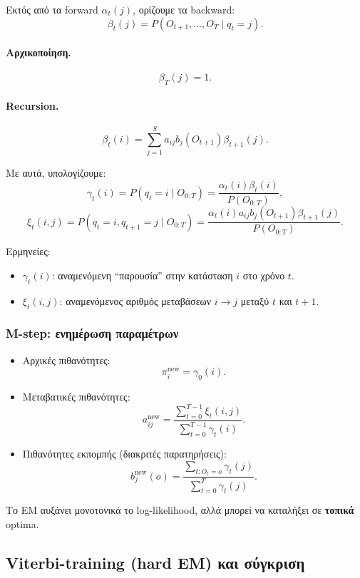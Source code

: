 \documentclass[a4paper,11pt]{article}
\begin{document}
Εκτός από τα forward $\alpha_t(j)$, ορίζουμε τα backward:
\[
\beta_t(j) = P(O_{t+1},\dots,O_T \mid q_t=j).
\]

\paragraph{Αρχικοποίηση.}
\[
\beta_T(j) = 1.
\]

\paragraph{Recursion.}
\[
\beta_t(i) = \sum_{j=1}^S a_{ij} b_j(O_{t+1}) \beta_{t+1}(j).
\]

Με αυτά, υπολογίζουμε:
\[
\gamma_t(i) = P(q_t=i\mid O_{0:T})
= \frac{\alpha_t(i)\beta_t(i)}{P(O_{0:T})},
\]
\[
\xi_t(i,j) = P(q_t=i, q_{t+1}=j \mid O_{0:T})
= \frac{\alpha_t(i) a_{ij} b_j(O_{t+1}) \beta_{t+1}(j)}{P(O_{0:T})}.
\]

Ερμηνείες:
\begin{itemize}
  \item $\gamma_t(i)$: αναμενόμενη ``παρουσία'' στην κατάσταση $i$ στο χρόνο $t$.
  \item $\xi_t(i,j)$: αναμενόμενος αριθμός μεταβάσεων $i\to j$ μεταξύ $t$ και $t+1$.
\end{itemize}

\subsubsection*{M-step: ενημέρωση παραμέτρων}

\begin{itemize}
  \item Αρχικές πιθανότητες:
        \[
        \pi_i^{\text{new}} = \gamma_0(i).
        \]
  \item Μεταβατικές πιθανότητες:
        \[
        a_{ij}^{\text{new}}
        = \frac{\sum_{t=0}^{T-1} \xi_t(i,j)}{\sum_{t=0}^{T-1} \gamma_t(i)}.
        \]
  \item Πιθανότητες εκπομπής (διακριτές παρατηρήσεις):
        \[
        b_j^{\text{new}}(o)
        = \frac{\sum_{t:O_t=o} \gamma_t(j)}{\sum_{t=0}^T \gamma_t(j)}.
        \]
\end{itemize}

Το EM αυξάνει μονοτονικά το log-likelihood, αλλά μπορεί να καταλήξει
σε \textbf{τοπικά} optima.

\subsection{Viterbi-training (hard EM) και σύγκριση}
\end{document}
